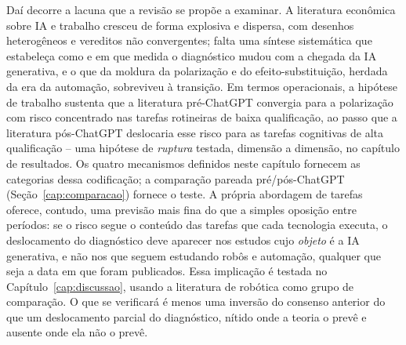 Daí decorre a lacuna que a revisão se propõe a examinar. A literatura econômica sobre IA e trabalho cresceu de forma explosiva e dispersa, com desenhos heterogêneos e vereditos não convergentes; falta uma síntese sistemática que estabeleça como e em que medida o diagnóstico mudou com a chegada da IA generativa, e o que da moldura da polarização e do efeito-substituição, herdada da era da automação, sobreviveu à transição. Em termos operacionais, a hipótese de trabalho sustenta que a literatura pré-ChatGPT convergia para a polarização com risco concentrado nas tarefas rotineiras de baixa qualificação, ao passo que a literatura pós-ChatGPT deslocaria esse risco para as tarefas cognitivas de alta qualificação -- uma hipótese de \emph{ruptura} testada, dimensão a dimensão, no capítulo de resultados. Os quatro mecanismos definidos neste capítulo fornecem as categorias dessa codificação; a comparação pareada pré/pós-ChatGPT (Seção~\ref{cap:comparacao}) fornece o teste. A própria abordagem de tarefas oferece, contudo, uma previsão mais fina do que a simples oposição entre períodos: se o risco segue o conteúdo das tarefas que cada tecnologia executa, o deslocamento do diagnóstico deve aparecer nos estudos cujo \emph{objeto} é a IA generativa, e não nos que seguem estudando robôs e automação, qualquer que seja a data em que foram publicados. Essa implicação é testada no Capítulo~\ref{cap:discussao}, usando a literatura de robótica como grupo de comparação. O que se verificará é menos uma inversão do consenso anterior do que um deslocamento parcial do diagnóstico, nítido onde a teoria o prevê e ausente onde ela não o prevê.
